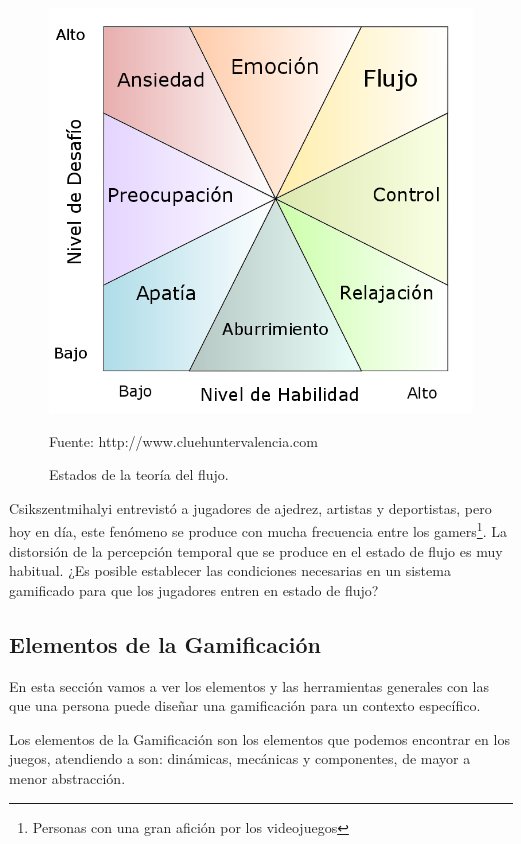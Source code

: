 \begin{figure}[hbt]
\begin{center}
\includegraphics[scale=0.40]{img/Flujo.png}
\caption{Estados de la teoría del flujo.}
\label{fig::Flujo}
\small{Fuente: http://www.cluehuntervalencia.com}
\end{center}
\vspace{-0.5cm}
\end{figure}
\FloatBarrier

Csikszentmihalyi entrevistó a jugadores de ajedrez, artistas y deportistas, pero hoy en día, este fenómeno se produce con mucha frecuencia entre los gamers\footnote{Personas con una gran afición por los videojuegos}.
%
La distorsión de la percepción temporal que se produce en el estado de flujo es muy habitual.
%
¿Es posible establecer las condiciones necesarias en un sistema gamificado para que los jugadores entren en estado de flujo?


\subsection{Elementos de la Gamificación}

En esta sección vamos a ver los elementos y las herramientas generales con las que una persona puede diseñar una gamificación para un contexto específico.

Los elementos de la Gamificación son los elementos que podemos encontrar en los juegos, atendiendo a \cite{werbach2012win} son: dinámicas, mecánicas y componentes, de mayor a menor abstracción.

